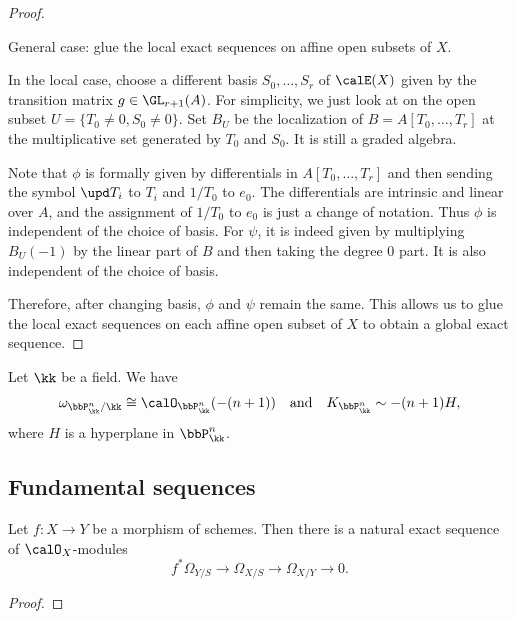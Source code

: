 \begin{proof}
        \begin{step}\label{step_in_Euler_sequence:glue_local_exact_sequences}
            General case: glue the local exact sequences on affine open subsets of \(X\).
        \end{step}

        In the local case, choose a different basis \(S_0, \ldots, S_r\) of \(\calE(X)\) given by the transition matrix \(g \in \GL_{r+1}(A)\).
        For simplicity, we just look at on the open subset \(U= \{T_0 \neq 0, S_0 \neq 0\}\).
        Set \(B_U\) be the localization of \(B = A[T_0, \ldots, T_r]\) at the multiplicative set generated by \(T_0\) and \(S_0\).
        It is still a graded algebra.
        
        Note that \(\phi\) is formally given by differentials in \(A[T_0, \ldots, T_r]\) and then sending the symbol \(\upd T_i\) to \(T_i\) and \(1/T_0\) to \(e_0\).
        The differentials are intrinsic and linear over \(A\), and the assignment of \(1/T_0\) to \(e_0\) is just a change of notation.
        Thus \(\phi\) is independent of the choice of basis.
        For \(\psi\), it is indeed given by multiplying \(B_U(-1)\) by the linear part of \(B\) and then taking the degree \(0\) part.
        It is also independent of the choice of basis.
        
        Therefore, after changing basis, \(\phi\) and \(\psi\) remain the same.
        This allows us to glue the local exact sequences on each affine open subset of \(X\) to obtain a global exact sequence.
    \end{proof}

    \begin{corollary}\label{cor:canonical_divisor_of_projective_space}
        Let \(\kk\) be a field.
        We have 
        \[ \omega_{\bbP^n_\kk/\kk} \cong \calO_{\bbP^n_\kk}(-(n+1)) \quad \text{and} \quad K_{\bbP^n_\kk} \sim -(n+1)H, \]
        where \(H\) is a hyperplane in \(\bbP^n_\kk\).
    \end{corollary}

\subsection{Fundamental sequences}

    \begin{theorem}\label{thm:the_first_fundamental_sequence_of_differentials}
        Let \(f: X \to Y\) be a morphism of schemes.
        Then there is a natural exact sequence of \(\calO_X\)-modules
        \[
            f^* \Omega_{Y/S} \to \Omega_{X/S} \to \Omega_{X/Y} \to 0.
        \]
    \end{theorem}
    \begin{proof}
    \end{proof}


